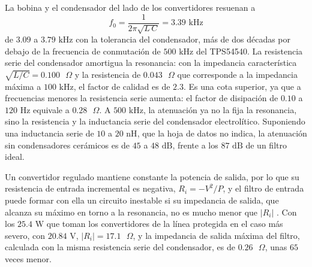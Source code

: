 \documentclass[../../General.tex]{subfiles}
\begin{document}
La bobina y el condensador del lado de los convertidores resuenan a
\begin{equation}
f_0 = \frac{1}{2\pi\sqrt{L\,C}} = 3.39\text{ kHz}
\end{equation}
de $3.09$ a $3.79\text{ kHz}$ con la tolerancia del condensador, más de dos décadas por debajo de la frecuencia de conmutación de $500\text{ kHz}$ del TPS54540. La resistencia serie del condensador amortigua la resonancia: con la impedancia característica $\sqrt{L/C} = 0.100\text{ }\Omega$ y la resistencia de $0.043\text{ }\Omega$ que corresponde a la impedancia máxima a $100\text{ kHz}$, el factor de calidad es de $2.3$. Es una cota superior, ya que a frecuencias menores la resistencia serie aumenta: el factor de disipación de $0.10$ a $120\text{ Hz}$ \citep{samxon_gt} equivale a $0.28\text{ }\Omega$. A $500\text{ kHz}$, la atenuación ya no la fija la resonancia, sino la resistencia y la inductancia serie del condensador electrolítico. Suponiendo una inductancia serie de $10$ a $20\text{ nH}$, que la hoja de datos no indica, la atenuación sin condensadores cerámicos es de $45$ a $48\text{ dB}$, frente a los $87\text{ dB}$ de un filtro ideal.

Un convertidor regulado mantiene constante la potencia de salida, por lo que su resistencia de entrada incremental es negativa, $R_i = -V^2/P$, y el filtro de entrada puede formar con ella un circuito inestable si su impedancia de salida, que alcanza su máximo en torno a la resonancia, no es mucho menor que $|R_i|$ \citep{middlebrook_1976}. Con los $25.4\text{ W}$ que toman los convertidores de la línea protegida en el caso más severo, con $20.84\text{ V}$, $|R_i| = 17.1\text{ }\Omega$, y la impedancia de salida máxima del filtro, calculada con la misma resistencia serie del condensador, es de $0.26\text{ }\Omega$, unas $65$ veces menor.
\end{document}
